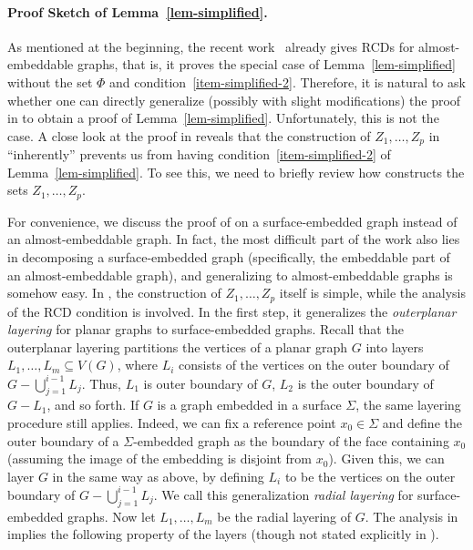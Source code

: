 \documentclass[a4paper,11pt]{article}
\numberwithin{lemma}{section}
\begin{document}
\paragraph{Proof Sketch of Lemma~\ref{lem-simplified}.}
As mentioned at the beginning, the recent work~\cite{BandyapadhyayLLSJ22} already gives RCDs for almost-embeddable graphs, that is, it proves the special case of Lemma~\ref{lem-simplified} without the set $\varPhi$ and condition~\ref{item-simplified-2}.
Therefore, it is natural to ask whether one can directly generalize (possibly with slight modifications) the proof in \cite{BandyapadhyayLLSJ22} to obtain a proof of Lemma~\ref{lem-simplified}.
Unfortunately, this is not the case.
A close look at the proof in \cite{BandyapadhyayLLSJ22} reveals that the construction of $Z_1,\dots,Z_p$ in \cite{BandyapadhyayLLSJ22} ``inherently'' prevents us from having condition~\ref{item-simplified-2} of Lemma~\ref{lem-simplified}.
To see this, we need to briefly review how \cite{BandyapadhyayLLSJ22} constructs the sets $Z_1,\dots,Z_p$.

For convenience, we discuss the proof of \cite{BandyapadhyayLLSJ22} on a surface-embedded graph instead of an almost-embeddable graph.
In fact, the most difficult part of the work \cite{BandyapadhyayLLSJ22} also lies in decomposing a surface-embedded graph (specifically, the embeddable part of an almost-embeddable graph), and generalizing to almost-embeddable graphs is somehow easy.
In \cite{BandyapadhyayLLSJ22}, the construction of $Z_1,\dots,Z_p$ itself is simple, while the analysis of the RCD condition is involved.
In the first step, it generalizes the \emph{outerplanar layering} for planar graphs to surface-embedded graphs.
Recall that the outerplanar layering partitions the vertices of a planar graph $G$ into layers $L_1,\dots,L_m \subseteq V(G)$, where $L_i$ consists of the vertices on the outer boundary of $G - \bigcup_{j=1}^{i-1} L_j$.
Thus, $L_1$ is outer boundary of $G$, $L_2$ is the outer boundary of $G - L_1$, and so forth.
If $G$ is a graph embedded in a surface $\varSigma$, the same layering procedure still applies.
Indeed, we can fix a reference point $x_0 \in \varSigma$ and define the outer boundary of a $\varSigma$-embedded graph as the boundary of the face containing $x_0$ (assuming the image of the embedding is disjoint from $x_0$).
Given this, we can layer $G$ in the same way as above, by defining $L_i$ to be the vertices on the outer boundary of $G - \bigcup_{j=1}^{i-1} L_j$.
We call this generalization \emph{radial layering} for surface-embedded graphs.
Now let $L_1,\dots,L_m$ be the radial layering of $G$.
The analysis in \cite{BandyapadhyayLLSJ22} implies the following property of the layers (though not stated explicitly in \cite{BandyapadhyayLLSJ22}).
\end{document}
